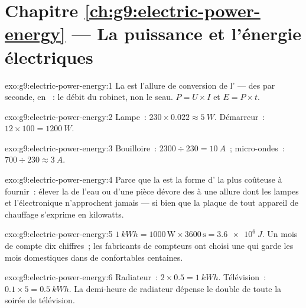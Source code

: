 \section*{Chapitre \ref{ch:g9:electric-power-energy} --- La puissance et l'énergie électriques}

\begin{solution}{exo:g9:electric-power-energy:1}
La  est l'allure de conversion de l' --- des 
par seconde, en ~: le débit du robinet, non le seau.
$P = U \times I$ et $E = P \times t$.
\end{solution}

\begin{solution}{exo:g9:electric-power-energy:2}
Lampe~: $230 \times 0.022 \approx \qty{5}{W}$. Démarreur~:
$12 \times 100 = \qty{1200}{W}$.
\end{solution}

\begin{solution}{exo:g9:electric-power-energy:3}
Bouilloire~: $2300 \div 230 = \qty{10}{A}$~; micro-ondes~:
$700 \div 230 \approx \qty{3}{A}$.
\end{solution}

\begin{solution}{exo:g9:electric-power-energy:4}
Parce que la  est la forme d' la plus coûteuse à
fournir~: élever la  de l'eau ou d'une pièce dévore des
 à une allure dont les lampes et l'électronique n'approchent
jamais --- si bien que la plaque de tout appareil de chauffage
s'exprime en kilowatts.
\end{solution}

\begin{solution}{exo:g9:electric-power-energy:5}
$\qty{1}{kWh} = 1000 \, \text{W} \times 3600 \, \text{s} =
\qty{3.6e6}{J}$. Un mois de  compte dix chiffres~; les
fabricants de compteurs ont choisi une  qui garde les mois
domestiques dans de confortables centaines.
\end{solution}

\begin{solution}{exo:g9:electric-power-energy:6}
Radiateur~: $2 \times 0.5 = \qty{1}{kWh}$. Télévision~:
$0.1 \times 5 = \qty{0.5}{kWh}$. La demi-heure de radiateur dépense
le double de toute la soirée de télévision.
\end{solution}

